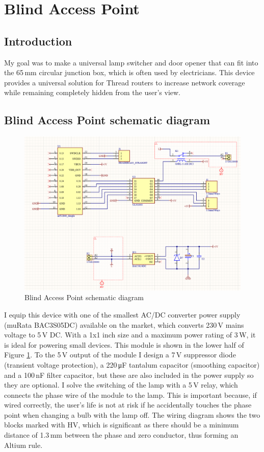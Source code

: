 \section{Blind Access Point}

\subsection{Introduction}
My goal was to make a universal lamp switcher and door opener that can fit into the 65\,\si{\milli\metre} circular junction box, which is often used by electricians. This device provides a universal solution for Thread routers to increase network coverage while remaining completely hidden from the user's view.


\subsection{Blind Access Point schematic diagram}
\begin{figure}[!htb]
    \centering
    \includegraphics[width=\textwidth]{img/bapschematics.png}
    \caption{Blind Access Point schematic diagram}
    \label{fig:bapschematics}
\end{figure}
\noindent
I equip this device with one of the smallest AC/DC converter power supply (muRata BAC3S05DC) available on the market, which converts 230\,\si{\volt} mains voltage to 5\,\si{\volt} DC. With a 1x1 inch size and a maximum power rating of 3\,\si{\watt}, it is ideal for powering small devices. This module is shown in the lower half of Figure \ref{fig:bapschematics}. To the 5\,\si{\volt} output of the module I design a 7\,\si{\volt} suppressor diode (transient voltage protection), a 220\,\si{\micro\farad} tantalum capacitor (smoothing capacitor) and a 100\,\si{\nano\farad} filter capacitor, but these are also included in the power supply so they are optional.
I solve the switching of the lamp with a 5\,\si{\volt} relay, which connects the phase wire of the module to the lamp. This is important because, if wired correctly, the user's life is not at risk if he accidentally touches the phase point when changing a bulb with the lamp off. The wiring diagram shows the two blocks marked with HV, which is significant as there should be a minimum distance of 1.3\,\si{\milli\metre} between the phase and zero conductor, thus forming an Altium rule.



